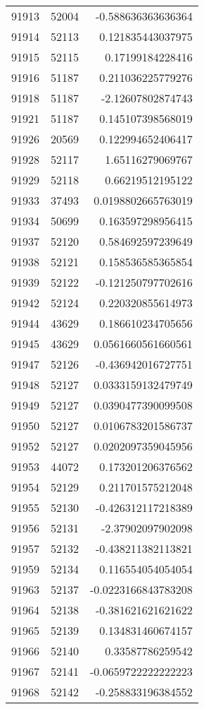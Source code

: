 \begin{tabular}{r | r | r}
91913 & 52004 & -0.588636363636364 \\
91914 & 52113 & 0.121835443037975 \\
91915 & 52115 & 0.17199184228416 \\
91916 & 51187 & 0.211036225779276 \\
91918 & 51187 & -2.12607802874743 \\
91921 & 51187 & 0.145107398568019 \\
91926 & 20569 & 0.122994652406417 \\
91928 & 52117 & 1.65116279069767 \\
91929 & 52118 & 0.66219512195122 \\
91933 & 37493 & 0.0198802665763019 \\
91934 & 50699 & 0.163597298956415 \\
91937 & 52120 & 0.584692597239649 \\
91938 & 52121 & 0.158536585365854 \\
91939 & 52122 & -0.121250797702616 \\
91942 & 52124 & 0.220320855614973 \\
91944 & 43629 & 0.186610234705656 \\
91945 & 43629 & 0.0561660561660561 \\
91947 & 52126 & -0.436942016727751 \\
91948 & 52127 & 0.0333159132479749 \\
91949 & 52127 & 0.0390477390099508 \\
91950 & 52127 & 0.0106783201586737 \\
91952 & 52127 & 0.0202097359045956 \\
91953 & 44072 & 0.173201206376562 \\
91954 & 52129 & 0.211701575212048 \\
91955 & 52130 & -0.426312117218389 \\
91956 & 52131 & -2.37902097902098 \\
91957 & 52132 & -0.438211382113821 \\
91959 & 52134 & 0.116554054054054 \\
91963 & 52137 & -0.0223166843783208 \\
91964 & 52138 & -0.381621621621622 \\
91965 & 52139 & 0.134831460674157 \\
91966 & 52140 & 0.33587786259542 \\
91967 & 52141 & -0.0659722222222223 \\
91968 & 52142 & -0.258833196384552 \\

\end{tabular}
